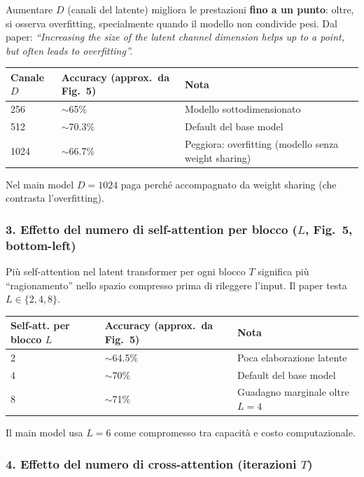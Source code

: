\documentclass[
  11pt,
]{article}
\begin{document}
Aumentare $D$ (canali del latente) migliora le prestazioni \textbf{fino a un punto}: oltre, si osserva overfitting, specialmente quando il modello non condivide pesi. Dal paper: \emph{``Increasing the size of the latent channel dimension helps up to a point, but often leads to overfitting''.}

{\small
\begin{longtable}{@{}p{3cm} p{3cm} p{6cm}@{}}
\toprule
\textbf{Canale $D$} & \textbf{Accuracy (approx.\ da Fig.\ 5)} & \textbf{Nota} \\
\midrule
\endhead
256  & $\sim$65\% & Modello sottodimensionato \\[2pt]
512  & $\sim$70.3\% & Default del base model \\[2pt]
1024 & $\sim$66.7\% & Peggiora: overfitting (modello senza weight sharing) \\[2pt]
\bottomrule
\end{longtable}
}

Nel main model $D = 1024$ paga perché accompagnato da weight sharing (che contrasta l'overfitting).

\subsubsection*{3. Effetto del numero di self-attention per blocco ($L$, Fig.\ 5, bottom-left)}

Più self-attention nel latent transformer per ogni blocco $T$ significa più ``ragionamento'' nello spazio compresso prima di rileggere l'input. Il paper testa $L \in \{2, 4, 8\}$.

{\small
\begin{longtable}{@{}p{4cm} p{3cm} p{5cm}@{}}
\toprule
\textbf{Self-att. per blocco $L$} & \textbf{Accuracy (approx.\ da Fig.\ 5)} & \textbf{Nota} \\
\midrule
\endhead
2 & $\sim$64.5\% & Poca elaborazione latente \\[2pt]
4 & $\sim$70\%   & Default del base model \\[2pt]
8 & $\sim$71\% & Guadagno marginale oltre $L = 4$ \\[2pt]
\bottomrule
\end{longtable}
}

Il main model usa $L = 6$ come compromesso tra capacità e costo computazionale.

\subsubsection*{4. Effetto del numero di cross-attention (iterazioni $T$)}
\end{document}
